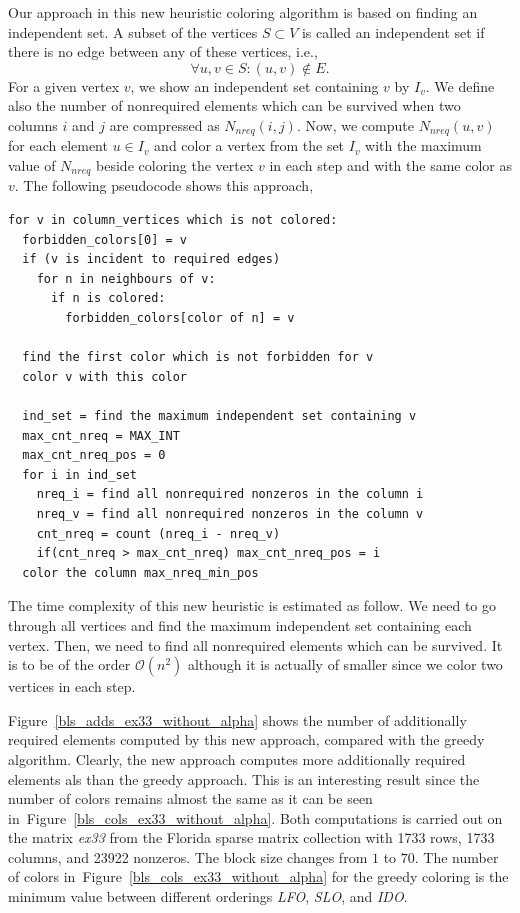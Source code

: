 \documentclass[12pt, oneside]{book}
\newcommand{\figref}[1]{Figure~\protect\ref{#1}}
\begin{document}
Our approach in this new heuristic coloring algorithm
is based on finding an independent set. A subset of the vertices $S\subset V$ is
called an independent set if there is no edge between any of these vertices, i.e.,
$$
\forall u,v\in S: (u,v)\notin E.
$$
For a given vertex $v$, we show an independent set containing $v$ by $I_v$.
We define also the number of nonrequired elements which can be 
survived when two columns $i$ and $j$ are compressed as $N_{nreq}(i,j)$.
Now, we compute $N_{nreq}(u,v)$ for each element $u\in I_v$
and color a vertex from the set $I_v$ with the maximum value of $N_{nreq}$
beside coloring the vertex $v$ in each step and with the same color as $v$.
The following pseudocode shows this approach, 
\begin{lstlisting}
for v in column_vertices which is not colored:
  forbidden_colors[0] = v
  if (v is incident to required edges) 
    for n in neighbours of v:
      if n is colored:
        forbidden_colors[color of n] = v

  find the first color which is not forbidden for v
  color v with this color

  ind_set = find the maximum independent set containing v
  max_cnt_nreq = MAX_INT
  max_cnt_nreq_pos = 0
  for i in ind_set
    nreq_i = find all nonrequired nonzeros in the column i
    nreq_v = find all nonrequired nonzeros in the column v
    cnt_nreq = count (nreq_i - nreq_v)
    if(cnt_nreq > max_cnt_nreq) max_cnt_nreq_pos = i
  color the column max_nreq_min_pos
\end{lstlisting}

The time complexity of this new heuristic is estimated as follow.
We need to go through all vertices 
and find the maximum independent set containing each vertex. 
Then, we need to find all nonrequired elements which can be survived.
It is to be of the order $\mathcal{O}(n^2)$ although it is actually 
of smaller since we color two vertices in each step. 

\figref{bls_adds_ex33_without_alpha} shows the number of additionally required elements
computed by this new approach, compared with the greedy algorithm. Clearly, 
the new approach computes more additionally required elements als than the greedy approach.
This is an interesting result since the number of colors remains almost the same
as it can be seen in~\figref{bls_cols_ex33_without_alpha}.
Both computations is carried out on the matrix \textit{ex33} from the Florida sparse matrix
collection with 1733 rows, 1733 columns, and 23922 nonzeros. The block size changes 
from $1$ to $70$. The number of colors in~\figref{bls_cols_ex33_without_alpha} for the greedy coloring
is the minimum value between different orderings \textit{LFO}, \textit{SLO}, and \textit{IDO}.
\end{document}
